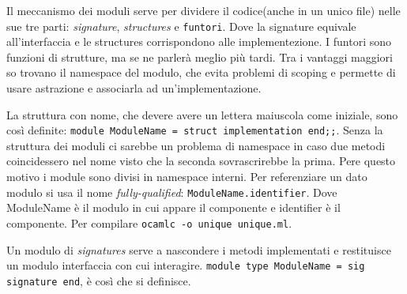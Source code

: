 \documentclass{article}
\begin{document}
\vspace*{0.5cm}

\hspace*{0.5cm}Il meccanismo dei moduli serve per dividere il codice(anche in un unico file) nelle sue tre parti: \textit{signature}, \textit{structures} e \texttt{funtori}.
Dove la signature equivale all'interfaccia e le structures corrispondono alle implementezione.
I funtori sono funzioni di strutture, ma se ne parlerà meglio più tardi.\newline
\hspace*{0.5cm}Tra i vantaggi maggiori so trovano il namespace del modulo, che evita problemi di scoping e permette di usare astrazione e associarla ad un'implementazione.

\vspace*{0.5cm}

\hspace*{0.5cm}La struttura con nome, che devere avere un lettera maiuscola come iniziale, sono così definite: \texttt{module ModuleName = struct implementation end;;}.
Senza la struttura dei moduli ci sarebbe un problema di namespace in caso due metodi coincidessero nel nome visto che la seconda sovrascrirebbe la prima.
Pere questo motivo i module sono divisi in namespace interni.\newline
\hspace*{0.5cm}Per referenziare un dato modulo si usa il nome \textit{fully-qualified}: \texttt{ModuleName.identifier}.
Dove ModuleName è il modulo in cui appare il componente e identifier è il componente.
Per compilare \texttt{ocamlc -o unique unique.ml}.

\vspace*{0.5cm}

\hspace*{0.5cm}Un modulo di \textit{signatures} serve a nascondere i metodi implementati e restituisce un modulo interfaccia con cui interagire. \texttt{module type ModuleName = sig signature end}, è così che si definisce.

\vspace*{0.5cm}
\end{document}
